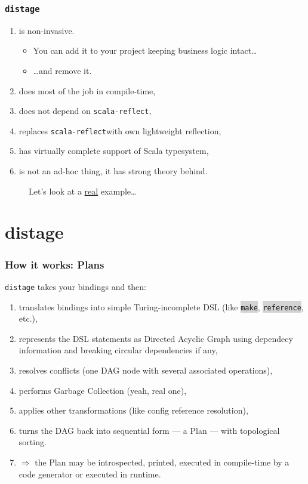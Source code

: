 \documentclass[usenames,dvipsnames]{beamer}
\newcommand{\code}[1]{\colorbox{lightgray}{\texttt{#1}}}
\newcommand{\distage}{\texttt{distage}\xspace}
\begin{document}
\begin{frame}
  \frametitle{\distage}
  \begin{enumerate}
  \item is non-invasive.
    \begin{itemize}
      \item You can add it to your project keeping business logic intact\dots
      \item \dots and remove it.
    \end{itemize}
  \item does most of the job in compile-time,
  \item does not depend on \texttt{scala-reflect}\footnotemark[1],
  \item replaces \texttt{scala-reflect}\footnotemark[2] with own lightweight reflection,
  \item has virtually complete support of Scala typesystem,
  \item is not an ad-hoc thing, it has strong theory behind.
  \end{enumerate}
\end{frame}

\begin{frame}
  \begin{figure}
  \Huge Let's look at a \underline{real} example\dots
  \end{figure}
\end{frame}

\section{distage}
\begin{frame}
  \frametitle{How it works: Plans}
  \distage takes your bindings and then:
  \begin{enumerate}
    \item translates bindings into simple Turing-incomplete DSL (like \code{make}, \code{reference}, etc.),
    \item represents the DSL statements as Directed Acyclic Graph using dependecy information and breaking circular dependencies if any,
    \item resolves conflicts (one DAG node with several associated operations),
    \item performs Garbage Collection (yeah, real one),
    \item applies other transformations (like config reference resolution),
    \item turns the DAG back into sequential form --- a Plan --- with topological sorting.
    \item $\Rightarrow$ the Plan may be introspected, printed, executed in compile-time by a code generator or executed in runtime.
  \end{enumerate}
\end{frame}
\end{document}
